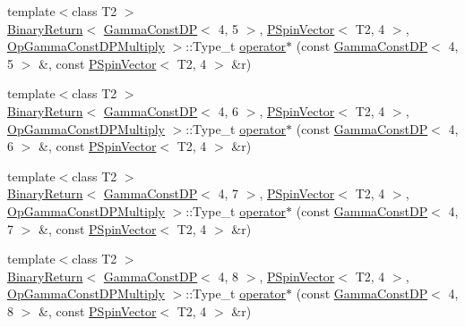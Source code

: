 \begin{DoxyCompactItemize}
\item 
{\footnotesize template$<$class T2 $>$ }\\\mbox{\hyperlink{structENSEM_1_1BinaryReturn}{Binary\+Return}}$<$ \mbox{\hyperlink{classENSEM_1_1GammaConstDP}{Gamma\+Const\+DP}}$<$ 4, 5 $>$, \mbox{\hyperlink{classENSEM_1_1PSpinVector}{P\+Spin\+Vector}}$<$ T2, 4 $>$, \mbox{\hyperlink{structENSEM_1_1OpGammaConstDPMultiply}{Op\+Gamma\+Const\+D\+P\+Multiply}} $>$\+::Type\+\_\+t \mbox{\hyperlink{group__primspinvector_gaedbd65630192bc0f45ecad29cfa08152}{operator$\ast$}} (const \mbox{\hyperlink{classENSEM_1_1GammaConstDP}{Gamma\+Const\+DP}}$<$ 4, 5 $>$ \&, const \mbox{\hyperlink{classENSEM_1_1PSpinVector}{P\+Spin\+Vector}}$<$ T2, 4 $>$ \&r)
\item 
{\footnotesize template$<$class T2 $>$ }\\\mbox{\hyperlink{structENSEM_1_1BinaryReturn}{Binary\+Return}}$<$ \mbox{\hyperlink{classENSEM_1_1GammaConstDP}{Gamma\+Const\+DP}}$<$ 4, 6 $>$, \mbox{\hyperlink{classENSEM_1_1PSpinVector}{P\+Spin\+Vector}}$<$ T2, 4 $>$, \mbox{\hyperlink{structENSEM_1_1OpGammaConstDPMultiply}{Op\+Gamma\+Const\+D\+P\+Multiply}} $>$\+::Type\+\_\+t \mbox{\hyperlink{group__primspinvector_ga118f057eadddaebf7485ca26d25ad24f}{operator$\ast$}} (const \mbox{\hyperlink{classENSEM_1_1GammaConstDP}{Gamma\+Const\+DP}}$<$ 4, 6 $>$ \&, const \mbox{\hyperlink{classENSEM_1_1PSpinVector}{P\+Spin\+Vector}}$<$ T2, 4 $>$ \&r)
\item 
{\footnotesize template$<$class T2 $>$ }\\\mbox{\hyperlink{structENSEM_1_1BinaryReturn}{Binary\+Return}}$<$ \mbox{\hyperlink{classENSEM_1_1GammaConstDP}{Gamma\+Const\+DP}}$<$ 4, 7 $>$, \mbox{\hyperlink{classENSEM_1_1PSpinVector}{P\+Spin\+Vector}}$<$ T2, 4 $>$, \mbox{\hyperlink{structENSEM_1_1OpGammaConstDPMultiply}{Op\+Gamma\+Const\+D\+P\+Multiply}} $>$\+::Type\+\_\+t \mbox{\hyperlink{group__primspinvector_ga06f03963e659581745493e56edf21491}{operator$\ast$}} (const \mbox{\hyperlink{classENSEM_1_1GammaConstDP}{Gamma\+Const\+DP}}$<$ 4, 7 $>$ \&, const \mbox{\hyperlink{classENSEM_1_1PSpinVector}{P\+Spin\+Vector}}$<$ T2, 4 $>$ \&r)
\item 
{\footnotesize template$<$class T2 $>$ }\\\mbox{\hyperlink{structENSEM_1_1BinaryReturn}{Binary\+Return}}$<$ \mbox{\hyperlink{classENSEM_1_1GammaConstDP}{Gamma\+Const\+DP}}$<$ 4, 8 $>$, \mbox{\hyperlink{classENSEM_1_1PSpinVector}{P\+Spin\+Vector}}$<$ T2, 4 $>$, \mbox{\hyperlink{structENSEM_1_1OpGammaConstDPMultiply}{Op\+Gamma\+Const\+D\+P\+Multiply}} $>$\+::Type\+\_\+t \mbox{\hyperlink{group__primspinvector_gaf50876f75a5b7bb882a7346408b4a90c}{operator$\ast$}} (const \mbox{\hyperlink{classENSEM_1_1GammaConstDP}{Gamma\+Const\+DP}}$<$ 4, 8 $>$ \&, const \mbox{\hyperlink{classENSEM_1_1PSpinVector}{P\+Spin\+Vector}}$<$ T2, 4 $>$ \&r)

\end{DoxyCompactItemize}
